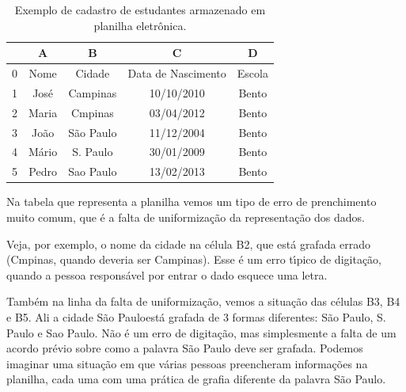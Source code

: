 \documentclass[
12pt,		%
openright,	%
twoside,  %
a4paper,			%
chapter=TITLE,		%
english,			%
french,				%
spanish,			%
brazil				%
]{USPSC-classe/USPSC}
\begin{document}
\begin{table}[htb]
\tiny
\caption{\label{ddd7a335bbc10f88eaaf4abda266d151f0ba0e6f}Exemplo de cadastro de estudantes armazenado em planilha eletr\^onica.}

\centering
\begin{tabular}{|c|c|c|c|c|}
\hline
  &  A  &  B  &  C  &  D  \\
\hline
0 & Nome  &  Cidade  &  Data de Nascimento  &  Escola \\
1 & Jos\'e  &  Campinas  &  10/10/2010  &  Bento \\
2 & Maria  &  Cmpinas  &  03/04/2012  &  Bento \\
3 & Jo\~ao  &  S\~ao Paulo  &  11/12/2004  &  Bento \\
4 & M\'ario  &  S. Paulo  &  30/01/2009  &  Bento \\
5 & Pedro  &  Sao Paulo  &  13/02/2013  &  Bento \\
\hline
\end{tabular}
\end{table}


Na tabela que representa a planilha vemos um tipo de erro de prenchimento muito comum, que \'e a falta de uniformiza\c{c}\~ao da representa\c{c}\~ao dos dados.














Veja, por exemplo, o nome da cidade na c\'elula B2, que est\'a grafada errado (Cmpinas, quando deveria ser Campinas). Esse \'e um erro t\'{\i}pico de digita\c{c}\~ao, quando a pessoa respons\'avel por entrar o dado esquece uma letra.














Tamb\'em na linha da falta de uniformiza\c{c}\~ao, vemos a situa\c{c}\~ao das c\'elulas B3, B4 e B5. Ali a cidade \textquotedbl S\~ao Paulo\textquotedbl  est\'a grafada de 3 formas diferentes: S\~ao Paulo, S. Paulo e Sao Paulo. N\~ao \'e um erro de digita\c{c}\~ao, mas simplesmente a falta de um acordo pr\'evio sobre como a palavra S\~ao Paulo deve ser grafada. Podemos imaginar uma situa\c{c}\~ao em que v\'arias pessoas preencheram informa\c{c}\~oes na planilha, cada uma com uma pr\'atica de grafia diferente da palavra S\~ao Paulo.
\end{document}

